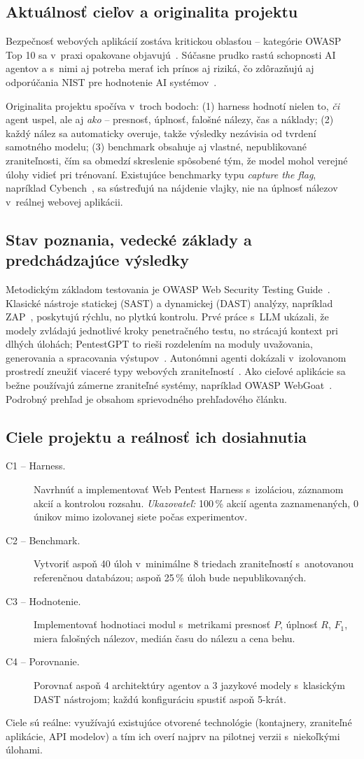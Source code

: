 \documentclass[11pt,a4paper]{article}
\newcommand{\bod}[1]{\subsection*{#1}}
\begin{document}
\bod{Aktuálnosť cieľov a originalita projektu}
Bezpečnosť webových aplikácií zostáva kritickou oblasťou -- kategórie OWASP Top 10 sa v~praxi opakovane objavujú~\cite{OWASP-Top10}. Súčasne prudko rastú schopnosti AI agentov a s~nimi aj potreba merať ich prínos aj riziká, čo zdôrazňujú aj odporúčania NIST pre hodnotenie AI systémov~\cite{NIST-AIME,NIST-ARIA}.

Originalita projektu spočíva v~troch bodoch: (1) harness hodnotí nielen to, \emph{či} agent uspel, ale aj \emph{ako} -- presnosť, úplnosť, falošné nálezy, čas a náklady; (2) každý nález sa automaticky overuje, takže výsledky nezávisia od tvrdení samotného modelu; (3) benchmark obsahuje aj vlastné, nepublikované zraniteľnosti, čím sa obmedzí skreslenie spôsobené tým, že model mohol verejné úlohy vidieť pri trénovaní. Existujúce benchmarky typu \emph{capture the flag}, napríklad Cybench~\cite{Zhang-Cybench}, sa sústreďujú na nájdenie vlajky, nie na úplnosť nálezov v~reálnej webovej aplikácii.

\bod{Stav poznania, vedecké základy a predchádzajúce výsledky}
Metodickým základom testovania je OWASP Web Security Testing Guide~\cite{OWASP-WSTG}. Klasické nástroje statickej (SAST) a dynamickej (DAST) analýzy, napríklad ZAP~\cite{ZAP}, poskytujú rýchlu, no plytkú kontrolu. Prvé práce s~LLM ukázali, že modely zvládajú jednotlivé kroky penetračného testu, no strácajú kontext pri dlhých úlohách; PentestGPT to rieši rozdelením na moduly uvažovania, generovania a spracovania výstupov~\cite{Deng-PentestGPT}. Autonómni agenti dokázali v~izolovanom prostredí zneužiť viaceré typy webových zraniteľností~\cite{Fang-HackWebsites}. Ako cieľové aplikácie sa bežne používajú zámerne zraniteľné systémy, napríklad OWASP WebGoat~\cite{OWASP-WebGoat}. Podrobný prehľad je obsahom sprievodného prehľadového článku.

\bod{Ciele projektu a reálnosť ich dosiahnutia}
\begin{description}
  \item[C1 -- Harness.] Navrhnúť a implementovať Web Pentest Harness s~izoláciou, záznamom akcií a kontrolou rozsahu. \emph{Ukazovateľ:} 100\,\% akcií agenta zaznamenaných, 0 únikov mimo izolovanej siete počas experimentov.
  \item[C2 -- Benchmark.] Vytvoriť aspoň 40 úloh v~minimálne 8 triedach zraniteľností s~anotovanou referenčnou databázou; aspoň 25\,\% úloh bude nepublikovaných.
  \item[C3 -- Hodnotenie.] Implementovať hodnotiaci modul s~metrikami presnosť $P$, úplnosť $R$, $F_1$, miera falošných nálezov, medián času do nálezu a cena behu.
  \item[C4 -- Porovnanie.] Porovnať aspoň 4 architektúry agentov a 3 jazykové modely s~klasickým DAST nástrojom; každú konfiguráciu spustiť aspoň 5-krát.
\end{description}
Ciele sú reálne: využívajú existujúce otvorené technológie (kontajnery, zraniteľné aplikácie, API modelov) a tím ich overí najprv na pilotnej verzii s~niekoľkými úlohami.
\end{document}
